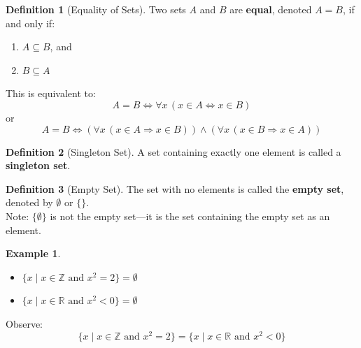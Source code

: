 \documentclass[
]{book}
\providecommand{\tightlist}{%
  \setlength{\itemsep}{0pt}\setlength{\parskip}{0pt}}
\theoremstyle{definition}
\newtheorem{definition}{Definition}[chapter]
\theoremstyle{definition}
\newtheorem{example}{Example}[chapter]
\theoremstyle{definition}
\theoremstyle{definition}
\theoremstyle{remark}
\begin{document}
\begin{definition}[Equality of Sets]
\protect\hypertarget{def:unnamed-chunk-125}{}\label{def:unnamed-chunk-125}Two sets \(A\) and \(B\) are \textbf{equal}, denoted \(A = B\), if and only if:

\begin{enumerate}
\def\labelenumi{\arabic{enumi}.}
\tightlist
\item
  \(A \subseteq B\), and\\
\item
  \(B \subseteq A\)
\end{enumerate}

This is equivalent to:
\[
A = B \iff \forall x \, (x \in A \Leftrightarrow x \in B)
\]
or
\[
A = B \iff \left( \forall x \, (x \in A \Rightarrow x \in B) \right) \land \left( \forall x \, (x \in B \Rightarrow x \in A) \right)
\]
\end{definition}

\begin{definition}[Singleton Set]
\protect\hypertarget{def:unnamed-chunk-126}{}\label{def:unnamed-chunk-126}A set containing exactly one element is called a \textbf{singleton set}.
\end{definition}

\begin{definition}[Empty Set]
\protect\hypertarget{def:unnamed-chunk-127}{}\label{def:unnamed-chunk-127}The set with no elements is called the \textbf{empty set}, denoted by \(\emptyset\) or \(\{\}\).\\
Note: \(\{\emptyset\}\) is not the empty set---it is the set containing the empty set as an element.
\end{definition}

\begin{example}
\protect\hypertarget{exm:unnamed-chunk-128}{}\label{exm:unnamed-chunk-128}\leavevmode

\begin{itemize}
\tightlist
\item
  \(\{x \mid x \in \mathbb{Z} \text{ and } x^2 = 2\} = \emptyset\)
\item
  \(\{x \mid x \in \mathbb{R} \text{ and } x^2 < 0\} = \emptyset\)
\end{itemize}

Observe:
\[
\{x \mid x \in \mathbb{Z} \text{ and } x^2 = 2\} = \{x \mid x \in \mathbb{R} \text{ and } x^2 < 0\}
\]

\end{example}
\end{document}
